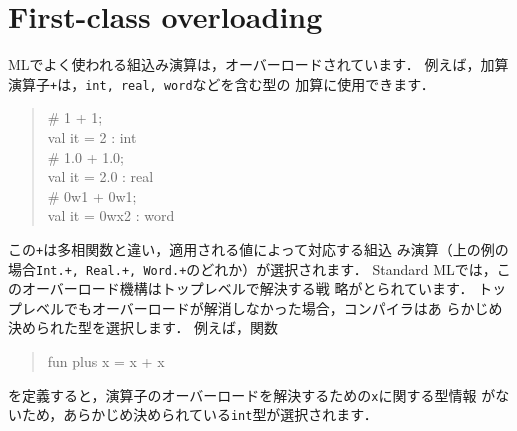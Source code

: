 \documentclass{jbook}
\newcommand{\txt}[2]{#2}
\begin{document}
\section{
\txt{第一級オーバーローディング}
    {First-class overloading}
}
\label{sec:extensionOverloading}

\ifjp%
	MLでよく使われる組込み演算は，オーバーロードされています．
	例えば，加算演算子{\tt +}は，{\tt int, real, word}などを含む型の
加算に使用できます．
\begin{tt}
\begin{quote}
\# 1 + 1;\\
val it = 2 : int\\
\# 1.0 + 1.0;\\
val it = 2.0 : real\\
\# 0w1 + 0w1;\\
val it = 0wx2 : word
\end{quote}
\end{tt}
	この{\tt +}は多相関数と違い，適用される値によって対応する組込
み演算（上の例の場合{\tt Int.+, Real.+, Word.+}のどれか）が選択されます．
	Standard MLでは，このオーバーロード機構はトップレベルで解決する戦
略がとられています．
	トップレベルでもオーバーロードが解消しなかった場合，コンパイラはあ
らかじめ決められた型を選択します．
	例えば，関数
\begin{tt}
\begin{quote}
fun plus x = x + x
\end{quote}
\end{tt}
を定義すると，演算子のオーバーロードを解決するための{\tt x}に関する型情報
がないため，あらかじめ決められている{\tt int}型が選択されます．
	
\end{document}
